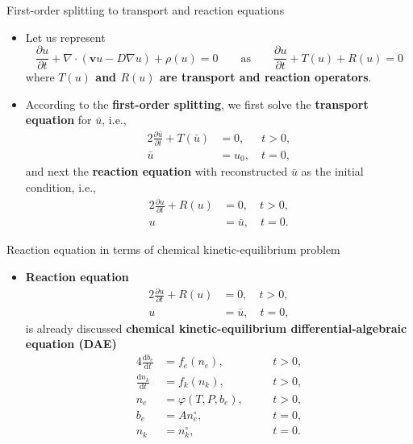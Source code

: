 %
\begin{frame}{First-order splitting to transport and reaction equations}
	\begin{itemize}
		\item Let us represent 
		\[\frac{\partial u}{\partial t}+\nabla\cdot(\boldsymbol{v}u-D\nabla u)  + \rho (u) = 0 \qquad \text{as} \qquad \frac{\partial u}{\partial t}+T(u) + R(u) = 0\] 
		where \alert{\bf $T(u)$ and $R(u)$ are transport and reaction operators}.\\[10pt]
		\pause
		\item According to the \alert{\bf first-order splitting}, we first solve the {\bf transport equation} for $\bar{u}$, i.e., 
		\begin{alignat*}{2}
		\frac{\partial \bar{u}}{\partial t}+T(\bar{u}) & = 0, \quad \;\: t > 0, \\[-5pt]
		\bar{u} &= u_0, \quad  t = 0, 
		\end{alignat*}
		and next the {\bf reaction equation} with reconstructed $\bar{u}$ as the initial condition, i.e.,  
		\begin{alignat*}{2}
			\frac{\partial u}{\partial t}+R(u) & = 0, \quad  t > 0, \\[-5pt]
			u & = \bar{u}, \quad  t = 0. 
		\end{alignat*}
	\end{itemize}
\end{frame}
%
%
\begin{frame}{Reaction equation in terms of chemical kinetic-equilibrium problem}
	\begin{itemize}
		\item{\bf Reaction equation} 
		\begin{alignat*}{2}
			\frac{\partial u}{\partial t}+R(u) & = 0, \quad  t > 0, \\[-5pt]
			u & = \bar{u}, \quad  t = 0,
		\end{alignat*}
		is already discussed \alert{\bf chemical kinetic-equilibrium differential-algebraic equation (DAE)} 
		\begin{alignat*}{4}
			\frac{\mathrm{d}b_{e}}{\mathrm{d}t} & = f_e(n_e), %
			& \quad  &  t > 0, \\
			\frac{\mathrm{d}n_{k}}{\mathrm{d}t} & = f_k(n_k),
			&  \quad & t>0, \\
			n_{e}  & = \varphi(T,P,b_{e}), & \quad  &  t > 0, \\
			b_{e}  & = An_{e}^{\circ},       & \quad  & t = 0, \\
			n_{k}  & = n_{k}^{\circ},         & \quad  & t=0.			
		\end{alignat*} 
	\end{itemize}
\end{frame}
